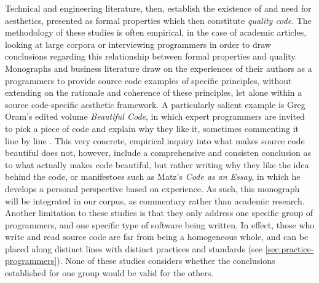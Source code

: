 Technical and engineering literature, then, establish the existence of and need for aesthetics, presented as formal properties which then constitute \emph{quality code}. The methodology of these studies is often empirical, in the case of academic articles, looking at large corpora or interviewing programmers in order to draw conclusions regarding this relationship between formal properties and quality. Monographs and business literature draw on the experiences of their authors as a programmers to provide source code examples of specific principles, without extending on the rationale and coherence of these principles, let alone within a source code-specific aesthetic framework. A particularly salient example is Greg Oram's edited volume \emph{Beautiful Code}, in which expert programmers are invited to pick a piece of code and explain why they like it, sometimes commenting it line by line \citep{oram_beautiful_2007}. This very concrete, empirical inquiry into what makes source code beautiful does not, however, include a comprehensive and consisten conclusion as to what actually makes code beautiful, but rather writing why they like the idea behind the code, or manifestoes such as Matz's \emph{Code as an Essay}, in which he develops a personal perspective based on experience. As such, this monograph will be integrated in our corpus, as commentary rather than academic research. Another limitation to these studies is that they only address one specific group of programmers, and one specific type of software being written. In effect, those who write and read source code are far from being a homogeneous whole, and can be placed along distinct lines with distinct practices and standards \citep{hayes_cultures_2017} (see \ref{sec:practice-programmers}). None of these studies considers whether the conclusions established for one group would be valid for the others.

